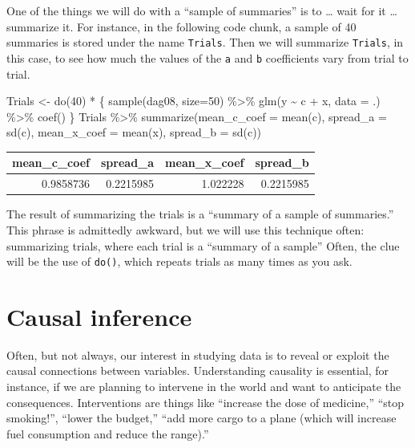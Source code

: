 \documentclass[
  letterpaper,
  DIV=11,
  numbers=noendperiod,
  oneside]{scrreprt}
\newenvironment{Shaded}{\begin{snugshade}}{\end{snugshade}}
\newcommand{\AttributeTok}[1]{\textcolor[rgb]{0.40,0.45,0.13}{#1}}
\newcommand{\DecValTok}[1]{\textcolor[rgb]{0.68,0.00,0.00}{#1}}
\newcommand{\FunctionTok}[1]{\textcolor[rgb]{0.28,0.35,0.67}{#1}}
\newcommand{\NormalTok}[1]{\textcolor[rgb]{0.00,0.23,0.31}{#1}}
\newcommand{\OtherTok}[1]{\textcolor[rgb]{0.00,0.23,0.31}{#1}}
\newcommand{\SpecialCharTok}[1]{\textcolor[rgb]{0.37,0.37,0.37}{#1}}
\begin{document}
One of the things we will do with a ``sample of summaries'' is to
\ldots{} wait for it \ldots{} summarize it. For instance, in the
following code chunk, a sample of 40 summaries is stored under the name
\texttt{Trials}. Then we will summarize \texttt{Trials}, in this case,
to see how much the values of the \texttt{a} and \texttt{b} coefficients
vary from trial to trial.

\begin{Shaded}
\begin{Highlighting}[]
\NormalTok{Trials }\OtherTok{\textless{}{-}} \FunctionTok{do}\NormalTok{(}\DecValTok{40}\NormalTok{) }\SpecialCharTok{*}\NormalTok{ \{}
  \FunctionTok{sample}\NormalTok{(dag08, }\AttributeTok{size=}\DecValTok{50}\NormalTok{) }\SpecialCharTok{\%\textgreater{}\%} 
    \FunctionTok{glm}\NormalTok{(y }\SpecialCharTok{\textasciitilde{}}\NormalTok{ c }\SpecialCharTok{+}\NormalTok{ x, }\AttributeTok{data =}\NormalTok{ .) }\SpecialCharTok{\%\textgreater{}\%}
    \FunctionTok{coef}\NormalTok{()}
\NormalTok{\} }
\NormalTok{Trials }\SpecialCharTok{\%\textgreater{}\%} 
  \FunctionTok{summarize}\NormalTok{(}\AttributeTok{mean\_c\_coef =} \FunctionTok{mean}\NormalTok{(c), }\AttributeTok{spread\_a =} \FunctionTok{sd}\NormalTok{(c), }
            \AttributeTok{mean\_x\_coef =} \FunctionTok{mean}\NormalTok{(x), }\AttributeTok{spread\_b =} \FunctionTok{sd}\NormalTok{(c))}
\end{Highlighting}
\end{Shaded}

\ttfamily 
\begin{tabular}{rrrr}
\toprule
mean\_c\_coef & spread\_a & mean\_x\_coef & spread\_b\\
\midrule
0.9858736 & 0.2215985 & 1.022228 & 0.2215985\\
\bottomrule
\end{tabular} \normalfont
\bigskip

The result of summarizing the trials is a ``summary of a sample of
summaries.'' This phrase is admittedly awkward, but we will use this
technique often: summarizing trials, where each trial is a ``summary of
a sample'' Often, the clue will be the use of \texttt{do()}, which
repeats trials as many times as you ask.

\hypertarget{causal-inference}{%
\section{Causal inference}\label{causal-inference}}

Often, but not always, our interest in studying data is to reveal or
exploit the causal connections between variables. Understanding
causality is essential, for instance, if we are planning to intervene in
the world and want to anticipate the consequences. Interventions are
things like ``increase the dose of medicine,'' ``stop smoking!'',
``lower the budget,'' ``add more cargo to a plane (which will increase
fuel consumption and reduce the range).''
\end{document}

